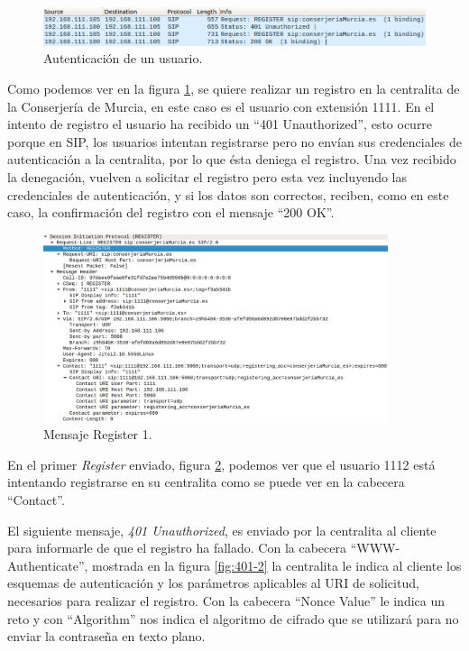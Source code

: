 \documentclass[a4paper]{article}
\begin{document}
\begin{figure}[htb]
    \begin{center}
                \includegraphics[width=1.1\textwidth]{autenticacion.png}
         \caption{Autenticación de un usuario.}
         \label{fig:autenticacion}
    \end{center}
\end{figure}

 Como podemos ver en la figura \ref{fig:autenticacion}, se quiere realizar un registro en la centralita de la Conserjería de Murcia, en este caso es el usuario con extensión 1111. En el intento de registro el usuario ha recibido un ``401 Unauthorized'', esto ocurre porque en SIP, los usuarios intentan registrarse pero no envían sus credenciales de autenticación a la centralita, por lo que ésta deniega el registro. Una vez recibido la denegación, vuelven a solicitar el registro pero esta vez incluyendo las credenciales de autenticación, y si los datos son correctos, reciben, como en este caso, la confirmación del registro con el mensaje ``200 OK''.
\newpage
\begin{figure}[htb]
    \begin{center}

        \includegraphics[width=0.9\textwidth]{register1.png}
         \caption{Mensaje Register 1.}
         \label{fig:reg1}
    \end{center}
\end{figure}

 En el primer \textit{Register} enviado, figura \ref{fig:reg1}, podemos ver que el usuario 1112 está intentando registrarse en su centralita como se puede ver en la cabecera ``Contact''.


 El siguiente mensaje, \textit{401 Unauthorized}, es enviado por la centralita al cliente para informarle de que el registro ha fallado. Con la cabecera ``WWW-Authenticate'', mostrada en la figura \ref{fig:401-2} la centralita le indica al cliente los esquemas de autenticación y los parámetros aplicables al URI de solicitud, necesarios para realizar el registro. Con la cabecera ``Nonce Value'' le indica un reto y con ``Algorithm''  nos indica el algoritmo de cifrado que se utilizará para no enviar la contraseña en texto plano.
\end{document}
